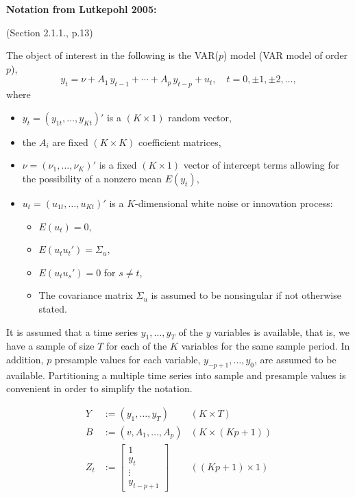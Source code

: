 \documentclass[12pt]{article}
\begin{document}
\textbf{Notation from Lutkepohl 2005:}

(Section 2.1.1., p.13)

The object of interest in the following is the VAR($ p $) model (VAR model of order $ p $),
\[
	y_t = \nu + A_1 \, y_{t-1} + \cdots + A_p \, y_{t-p} + u_t, \quad t = 0, \pm 1, \pm 2, \dots,
\]
where 
\begin{itemize}
	\item $ y_t = (y_{1t}, \dots, y_{Kt})' $ is a $ (K \times 1) $ random vector,
	\item the $ A_i $ are fixed $ (K \times K) $ coefficient matrices,
	\item $ \nu = (\nu_1, \dots , \nu_K)' $ is a fixed $ (K \times 1) $ vector of intercept terms allowing for the possibility of a nonzero mean $ E(y_t) $,
	\item $ u_t = (u_{1t}, \dots, u_{Kt})' $ is a $ K $-dimensional white noise or innovation process: 
	\begin{itemize}
		\item $ E(u_t) = 0 $,
		\item $ E(u_t u_t') = \Sigma_u $,
		\item $ E(u_t u_s') = 0 $ for $ s \neq t $,
		\item The covariance matrix $ \Sigma_u $ is assumed to be nonsingular if not otherwise stated.
	\end{itemize}
\end{itemize}

It is assumed that a time series $ y_1, \dots, y_T $ of the $ y $ variables is available, that is, we have a sample of size $ T $ for each of the $ K $ variables for the same sample period. In addition, $ p $ presample values for each variable, $ y_{−p+1}, \dots, y_0 $, are assumed to be available. Partitioning a multiple time series into sample and presample values is convenient in order to simplify the notation. 

\begin{align*}
	Y   & :=  (y_1, \dots, y_T)      & (K \times T)        \\
	B   & :=    (v, A_1, \dots, A_p) & (K \times (Kp + 1)) \\
	Z_t & :=  	\left[ \begin{array}{c}
						1 \\
						y_t \\
						\vdots \\
						y_{t-p+1}
					\end{array} \right]                       & ((Kp + 1) \times 1) \\
\end{align*}
\end{document}
